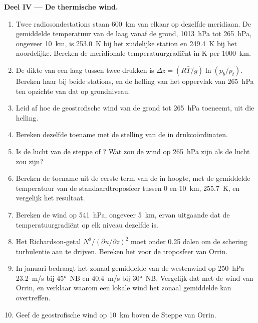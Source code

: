 \begin{problem}
\medskip\noindent\textbf{Deel IV --- De thermische wind.}
\begin{enumerate}[resume]
\item Twee radiosondestations staan \qty{600}{km} van elkaar op dezelfde
  meridiaan. De gemiddelde temperatuur van de laag vanaf de grond,
  \qty{1013}{hPa} tot \qty{265}{hPa}, ongeveer \qty{10}{km}, is \qty{253.0}{K}
  bij het zuidelijke station en \qty{249.4}{K} bij het noordelijke. Bereken de
  meridionale temperatuurgradiënt in \unit{K} per \qty{1000}{km}.
\item De dikte van een laag tussen twee drukken is $\Delta z = (R\bar
  T/g)\ln(p_b/p_t)$. Bereken haar bij beide stations, en de helling van het
  oppervlak van \qty{265}{hPa} ten opzichte van dat op grondniveau.
\item Leid af hoe de geostrofische wind van de grond tot
  \qty{265}{hPa} toeneemt, uit die helling.
\item Bereken dezelfde toename met de stelling van de  in drukcoördinaten.
\item Is de lucht van de steppe  of ? Wat zou de wind
  op \qty{265}{hPa} zijn als de lucht  zou zijn?
\item Bereken de toename uit de eerste term van de  in
  hoogte, met de gemiddelde temperatuur van de standaardtroposfeer tussen 0
  en \qty{10}{km}, \qty{255.7}{K}, en vergelijk het resultaat.
\item Bereken de wind op \qty{541}{hPa}, ongeveer \qty{5}{km}, ervan uitgaande dat de
  temperatuurgradiënt op elk niveau dezelfde is.
\item Het Richardson-getal $N^2/(\partial u/\partial z)^2$ moet onder
  0.25 dalen om de schering turbulentie aan te drijven. Bereken het voor de troposfeer van
  Orrin.
\item In januari bedraagt het zonaal gemiddelde van de westenwind op \qty{250}{hPa} \qty{23.2}{m/s}
  bij \ang{45}~NB en \qty{40.4}{m/s} bij \ang{30}~NB. Vergelijk dat met de wind van Orrin, en verklaar
  waarom een lokale wind het zonaal gemiddelde kan overtreffen.
\item Geef de geostrofische wind op \qty{10}{km} boven de Steppe van Orrin.
\end{enumerate}
\end{problem}
